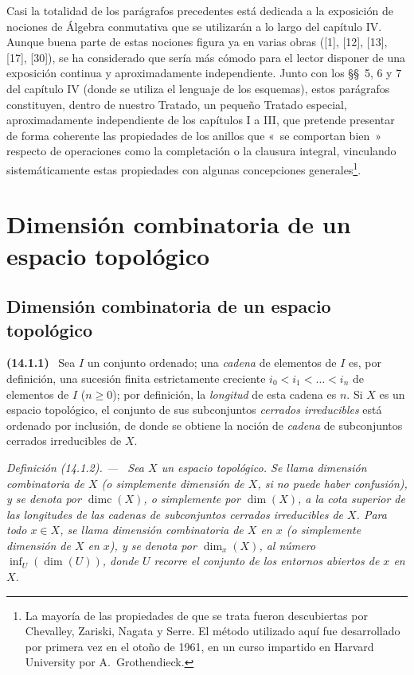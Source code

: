 \documentclass[10pt,oneside]{book}
\makeatletter
\newcommand{\setmanualcurrentlabel}[1]{\def\@currentlabel{#1}}
\newcommand{\oldpage}[2][]{%
  \setcounter{footnote}{0}%
  \marginpar{\scriptsize\textbf{#1}~|~#2}\ignorespaces}
\newenvironment{env}[1][]{\setmanualcurrentlabel{#1}\par\medskip\noindent\textbf{(#1)}\ }{\par}
\newenvironment{definition}[1][]{%
  \setmanualcurrentlabel{#1}\par\medskip\noindent\itshape Definición (#1). ---\ }{\par}
\makeatother
\begin{document}
Casi la totalidad de los parágrafos precedentes está dedicada a la exposición
de nociones de Álgebra conmutativa que se utilizarán a lo largo del capítulo
IV. Aunque buena parte de estas nociones figura ya en varias obras ([1], [12],
[13], [17], [30]), se ha considerado que sería más cómodo para el lector
disponer de una exposición continua y aproximadamente independiente. Junto con
los \S\S~5, 6 y 7 del capítulo IV (donde se utiliza el lenguaje de los
esquemas), estos parágrafos constituyen, dentro de nuestro Tratado, un pequeño
Tratado especial, aproximadamente independiente de los capítulos I a III, que
pretende presentar de forma coherente las propiedades de los anillos que «~se
comportan bien~» respecto de operaciones como la completación o la clausura
integral, vinculando sistemáticamente estas propiedades con algunas
concepciones generales\footnote{La mayoría de las propiedades de que se trata
fueron descubiertas por Chevalley, Zariski, Nagata y Serre. El método utilizado
aquí fue desarrollado por primera vez en el otoño de 1961, en un curso impartido
en Harvard University por A.~Grothendieck.}.

\setcounter{section}{13}
\section{Dimensión combinatoria de un espacio topológico}
\label{section:0.14-es}

\setcounter{subsection}{0}
\subsection{Dimensión combinatoria de un espacio topológico}
\label{subsection:0.14.1-es}

\oldpage[0\textsubscript{IV-1}]{6}
\begin{env}[14.1.1]
\label{0.14.1.1-es}
Sea $I$ un conjunto ordenado; una \emph{cadena} de elementos de $I$ es, por
definición, una sucesión finita estrictamente creciente
$i_0<i_1<\ldots<i_n$ de elementos de $I$ ($n\geq 0$); por definición, la
\emph{longitud} de esta cadena es $n$. Si $X$ es un espacio topológico, el
conjunto de sus subconjuntos \emph{cerrados irreducibles} está ordenado por
inclusión, de donde se obtiene la noción de \emph{cadena} de subconjuntos
cerrados irreducibles de $X$.
\end{env}

\begin{definition}[14.1.2]
\label{0.14.1.2-es}
Sea $X$ un espacio topológico. Se llama dimensión combinatoria de $X$
\textup{(o simplemente} dimensión de $X$\textup{, si no puede haber confusión)}, y se
denota por $\operatorname{dimc}(X)$, o simplemente por $\dim(X)$, a la cota superior de las
longitudes de las cadenas de subconjuntos cerrados irreducibles de $X$. Para
todo $x\in X$, se llama dimensión combinatoria de $X$ en $x$ \textup{(o
simplemente} dimensión de $X$ en $x$), y se denota por $\dim_x(X)$, al
número $\inf_U(\dim(U))$, donde $U$ recorre el conjunto de los entornos
abiertos de $x$ en $X$.
\end{definition}
\end{document}
